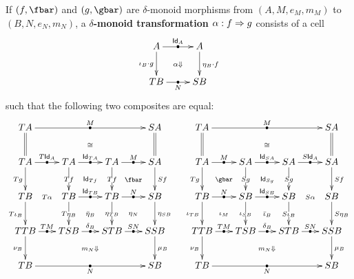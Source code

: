\documentclass{amsart}
\let\tc\cdot
\newcommand{\hunit}[1]{\Id_{#1}}
\newcommand{\Tmult}{\nu}
\newcommand{\Tunit}{\iota}
\newcommand{\Smult}{\mu}
\newcommand{\Sunit}{\eta}
\newcommand{\dl}{\delta}
\newcommand{\Tdlunit}{\bar\Tunit}%
\newcommand{\Sdlunit}{\bar\Sunit}%
\newcommand{\Id}{\mathsf{Id}}
\begin{document}
\begin{defn}
  If $(f,\fbar)$ and $(g,\gbar)$ are $\dl$-monoid morphisms from $(A,M,e_M,m_M)$ to $(B,N,e_N,m_N)$, a \textbf{$\dl$-monoid transformation} $\alpha:f\Rightarrow g$ consists of a cell
  \[ \xymatrix{ A \ar[r]|{\bullet}^{\hunit A} \ar[d]_{\Tunit_B \tc g %
} \ar@{}[dr]|{\al\Downarrow} & A \ar[d]^{\Sunit_B \tc f %
} \\ T B \ar[r]|{\bullet}_{N} & S B } \]
  such that the following two composites are equal:
  \[
  \xymatrix@C=1.5pc{
    T A \ar[rrr]|{\bullet}^M \ar@{=}[d] \ar@{}[drrr]|{\cong} &&& S A \ar@{=}[d]\\
    T A \ar[r]|{\bullet}^{T\hunit A} \ar[d]_{Tg} \ar@{}[ddr]|{T\al} &
    T A \ar[d]|{T f} \ar@{}[dr]|{\hunit{T f}} \ar[r]|{\bullet}^{\hunit{TA}} &
    T A \ar[d]|{T f} \ar@{}[dr]|{\fbar} \ar[r]|{\bullet}^M &
    S A \ar[d]^{S f}\\
    T B \ar[d]_{T\Tunit_B } &
    T B \ar[d]|{T\Sunit_B} \ar[r]|{\bullet}^{\hunit{T B}} \ar@{}[dr]|{\Sdlunit_B} &
    T B \ar[d]|{\Sunit_{TB}} \ar[r]|{\bullet}^{N} \ar@{}[dr]|{\Sunit_N} & S B \ar[d]^{\Sunit_{S B}}\\
    T T B \ar[r]|{\bullet}^{T M} \ar[d]_{\Tmult_B} \ar@{}[drrr]|{m_N\Downarrow} &
    T S B \ar[r]|{\bullet}^{\dl_B} & S T B \ar[r]|{\bullet}^{S N} & S S B \ar[d]^{\Smult_B}\\
    T B \ar[rrr]|{\bullet}_N &&& S B
    }
    \quad
    \xymatrix@C=1.5pc{
    T A \ar[rrr]|{\bullet}^M \ar@{=}[d] \ar@{}[drrr]|{\cong} &&& S A \ar@{=}[d]\\
    T A \ar[r]|{\bullet}^{M} \ar[d]_{T g} \ar@{}[dr]|{\gbar} &
    S A \ar[d]|{S g} \ar@{}[dr]|{\hunit{S g}} \ar[r]|{\bullet}^{\hunit{SA}} &
    S A \ar[d]|{S g}  \ar@{}[ddr]|{S\al} \ar[r]|{\bullet}^{S\hunit A} &
    S A \ar[d]^{S f}\\
    T B \ar[d]_{\Tunit_{TB}} \ar[r]|{\bullet}^{N} \ar@{}[dr]|{\Tunit_M} &
    S B \ar[d]|{\Tunit_{SB}} \ar[r]|{\bullet}^{\hunit{S B}} \ar@{}[dr]|{\Tdlunit_B} &
    S B \ar[d]|{S \Tunit_B}  & S B \ar[d]^{S\Sunit_B}\\
    T T B \ar[r]|{\bullet}^{T M} \ar[d]_{\Tmult_B} \ar@{}[drrr]|{m_N\Downarrow} &
    T S B \ar[r]|{\bullet}^{\dl_B} & S T B \ar[r]|{\bullet}^{S N} & S S B \ar[d]^{\Smult_B}\\
    T B \ar[rrr]|{\bullet}_N &&& S B
  }
\]
\end{defn}
\end{document}

